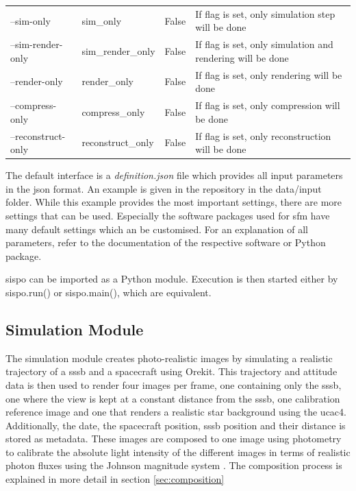 \begin{table}[htpb]
\begin{tabular}{p{}|p{}|p{}|p{}}
\multicolumn{1}{l|}{--sim-only}          & sim\_only              & False                      & If flag is set, only simulation step will be done                                                                         \\
\multicolumn{1}{l|}{--sim-render-only}   & sim\_render\_only      & False                      & If flag is set, only simulation and rendering will be done                                                                \\
\multicolumn{1}{l|}{--render-only}       & render\_only           & False                      & If flag is set, only rendering will be done                                                                               \\
\multicolumn{1}{l|}{--compress-only}     & compress\_only         & False                      & If flag is set, only compression will be done                                                                             \\
\multicolumn{1}{l|}{--reconstruct-only}  & reconstruct\_only      & False                      & If flag is set, only reconstruction will be done                                                                         

\end{tabular}
\label{tab:cli_args}
\end{table}

The default interface is a \textit{definition.json} file which provides all input parameters in the \gls{json} format. An example is given in the repository in the data/input folder. While this example provides the most important settings, there are more settings that can be used. Especially the software packages used for \gls{sfm} have many default settings which an be customised. For an explanation of all parameters, refer to the documentation of the respective software or Python package.

\gls{sispo} can be imported as a Python module. Execution is then started either by sispo.run() or sispo.main(), which are equivalent.

\subsection{Simulation Module}
The simulation module creates photo-realistic images by simulating a realistic trajectory of a \gls{sssb} and a spacecraft using Orekit. This trajectory and attitude data is then used to render four images per frame, one containing only the \gls{sssb}, one where the view is kept at a constant distance from the \gls{sssb}, one calibration reference image and one that renders a realistic star background using the \gls{ucac4}. Additionally, the date, the spacecraft position, \gls{sssb} position and their distance is stored as metadata. These images are composed to one image using photometry to calibrate the absolute light intensity of the different images in terms of realistic photon fluxes using the Johnson magnitude system \cite{bessel1979ubvri}. The composition process is explained in more detail in section \ref{sec:composition}

